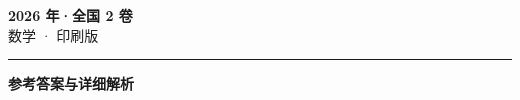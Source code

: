 \documentclass[zihao=5, a4paper]{ctexart}
\begin{document}
\begin{center}
  {\Large\bfseries 2026 年·全国 2 卷}\\[4pt]
  {\large 数学 · 印刷版}
\end{center}
\medskip
{}

\par\bigskip\hrule\bigskip
{}
\begin{center}{\large\bfseries 参考答案与详细解析}\end{center}
\smallskip

\end{document}
